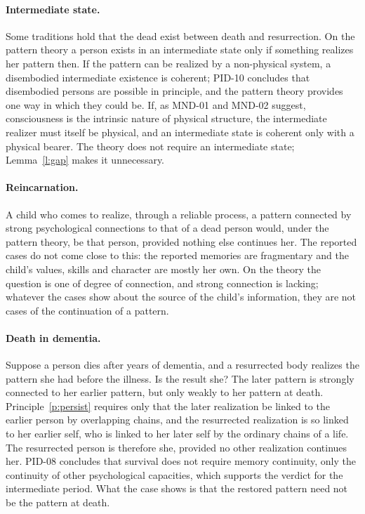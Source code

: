 \documentclass{situationist-preprint}
\begin{document}
\paragraph{Intermediate state.} Some traditions hold that the dead exist between death and resurrection. On the pattern theory a person exists in an intermediate state only if something realizes her pattern then. If the pattern can be realized by a non-physical system, a disembodied intermediate existence is coherent; PID-10 concludes that disembodied persons are possible in principle, and the pattern theory provides one way in which they could be. If, as MND-01 and MND-02 suggest, consciousness is the intrinsic nature of physical structure, the intermediate realizer must itself be physical, and an intermediate state is coherent only with a physical bearer. The theory does not require an intermediate state; Lemma~\ref{l:gap} makes it unnecessary.

\paragraph{Reincarnation.} A child who comes to realize, through a reliable process, a pattern connected by strong psychological connections to that of a dead person would, under the pattern theory, be that person, provided nothing else continues her. The reported cases do not come close to this: the reported memories are fragmentary and the child's values, skills and character are mostly her own. On the theory the question is one of degree of connection, and strong connection is lacking; whatever the cases show about the source of the child's information, they are not cases of the continuation of a pattern.

\paragraph{Death in dementia.} Suppose a person dies after years of dementia, and a resurrected body realizes the pattern she had before the illness. Is the result she? The later pattern is strongly connected to her earlier pattern, but only weakly to her pattern at death. Principle~\ref{p:persist} requires only that the later realization be linked to the earlier person by overlapping chains, and the resurrected realization is so linked to her earlier self, who is linked to her later self by the ordinary chains of a life. The resurrected person is therefore she, provided no other realization continues her. PID-08 concludes that survival does not require memory continuity, only the continuity of other psychological capacities, which supports the verdict for the intermediate period. What the case shows is that the restored pattern need not be the pattern at death.
\end{document}
